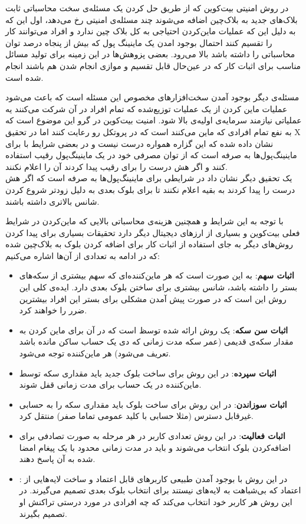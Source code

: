 در روش امنیتی بیت‌کوین که از طریق حل کردن یک مسئله‌ی سخت محاسباتی ثابت بلاک‌های جدید به بلاک‌چین اضافه می‌شوند چند مسئله‌ی امنیتی رخ می‌دهد، اول این که به دلیل این که عملیات ماین‌کردن احتیاجی به کل بلاک چین ندارد و افراد می‌توانند کار را تقسیم کنند احتمال بوجود امدن یک ماینینگ پول که بیش از پنجاه‌ درصد توان محاسباتی را داشته باشد بالا می‌رود. بعضی پزوهش‌ها در این زمینه برای تولید مسائل مناسب برای اثبات کار که در عین‌حال قابل تقسیم و موازی انجام شدن هم باشند انجام شده است. 
\par
مسئله‌ی دیگر بوجود آمدن سخت‌افزارهای مخصوص این مسئله‌ است که باعث می‌شود عملیات ماین کردن از یک عملیات توزیع‌شده که تمام افراد در آن شرکت می‌کنند یه عملیاتی نیازمند سرمایه‌ی اولیه‌ی بالا شود. 
امنیت بیت‌کوین در گرو این موضوع است که به نفع تمام افرادی که ماین‌ می‌کنند است که در پروتکل رو رعایت کنند اما در تحقیق X نشان داده شده که این گزاره همواره درست نیست و در بعضی شرایط با برای ماینینگ‌پول‌ها به صرفه است که از توان مصرفی خود در یک ماینینگ‌پول رقیب استفاده‌ کنند و اگر هش درست را برای رقیب پیدا کردند آن را اعلام نکنند. 
\\
یک تحقیق دیگر نشان داد در شرایطی برای ماینینگ‌پول‌ها به صرفه است که اگر هش درست را پیدا کردند به بقیه اعلام نکنند تا برای بلوک بعدی به دلیل زودتر شروع کردن شانس بالا‌تری داشته باشند. 
\par
با توجه به این شرایط و همچنین هزینه‌ی محاسباتی بالایی که ماین‌کردن در شرایط فعلی بیت‌کوین و بسیاری از ارزهای دیجیتال دیگر دارد تحقیقات بسیاری برای پیدا کردن روش‌های دیگر به جای استفاده از اثبات کار برای اضافه کردن بلوک به بلاک‌چین شده که در ادامه به تعدادی از آن‌ها اشاره می‌کنیم:
\\
\begin{itemize}
	\item \textbf{اثبات سهم}:
	به این صورت است که هر ماین‌کننده‌ای که سهم بیشتری از سکه‌های بستر را داشته باشد، شانس بیشتری برای ساختن بلوک بعدی دارد. ایده‌ی کلی این روش این است که در صورت پیش آمدن مشکلی برای بستر این افراد بیشترین ضرر را خواهند کرد. 
	\item \textbf{اثبات سن سکه}:
	یک روش ارائه شده توسظ 
	است که در آن برای ماین کردن به مقدار سکه‌ی قدیمی (عمر سکه مدت زمانی که دی یک حساب ساکن مانده باشد تعریف می‌شود) هر ماین‌کننده توجه می‌شود.
	\item \textbf{اثبات سپرده}:
	در این روش برای ساخت بلوک‌ جدید باید مقداری سکه توسط ماین‌کننده در یک حساب برای مدت زمانی قفل شوند.
	\item \textbf{اثبات سوزاندن}:
	در این روش برای ساخت بلوک‌ باید مقداری سکه را به حسابی غیرقابل دسترس (مثلا حسابی با کلید عمومی تماما صفر) منتقل کرد.
	\item \textbf{اثبات فعالیت}:
	در این روش تعدادی کاربر در هر مرحله به صورت تصادفی  برای اضافه‌کردن بلوک انتخاب می‌شوند و باید در مدت زمانی محدود با یک پیغام امضا شده به آن پاسخ دهند. 
	\item \textbf{}:
	در این روش با بوجود آمدن طبیعی کاربرهای قابل اعتماد و ساخت لایه‌هایی از اعتماد که بی‌شباهت به لایه‌های 
	نیستند برای انتخاب بلوک بعدی تصمیم می‌گیرند. در این روش هر کاربر خود انتخاب می‌کند که چه افرادی در مورد درستی تراکنش او تصمیم بگیرند.
\end{itemize}

